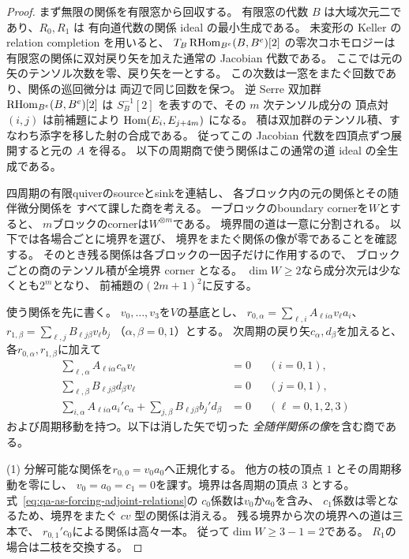 \begin{proof}
まず無限の関係を有限窓から回収する。
有限窓の代数 $B$ は大域次元二であり、$R_0,R_1$ は
有向道代数の関係 ideal の最小生成である。
未変形の Keller の relation completion
\cite[Theorem 6.10]{KellerDeformedCY2011} を用いると、
$T_B\operatorname{RHom}_{B^e}(B,B^e)[2]$ の零次コホモロジーは
有限窓の関係に双対戻り矢を加えた通常の Jacobian 代数である。
ここでは元の矢のテンソル次数を零、戻り矢を一とする。
この次数は一窓をまたぐ回数であり、関係の巡回微分は
両辺で同じ回数を保つ。
逆 Serre 双加群 $\operatorname{RHom}_{B^e}(B,B^e)[2]$ は
$S_B^{-1}[2]$ を表すので、その $m$ 次テンソル成分の
頂点対 $(i,j)$ は前補題により $\operatorname{Hom}(E_i,E_{j+4m})$ になる。
積は双加群のテンソル積、すなわち添字を移した射の合成である。
従ってこの Jacobian 代数を四頂点ずつ展開すると元の $A$ を得る。
以下の周期商で使う関係はこの通常の道 ideal の全生成である。

四周期の有限quiverのsourceとsinkを連結し、
各ブロック内の元の関係とその随伴微分関係を
すべて課した商を考える。
一ブロックのboundary cornerを$W$とすると、
$m$ブロックのcornerは$W^{\otimes m}$である。
境界間の道は一意に分割される。
以下では各場合ごとに境界を選び、
境界をまたぐ関係の像が零であることを確認する。
そのとき残る関係は各ブロックの一因子だけに作用するので、
ブロックごとの商のテンソル積が全境界 corner となる。
$\dim W\ge2$なら成分次元は少なくとも$2^m$となり、
前補題の$(2m+1)^2$に反する。

使う関係を先に書く。
$v_0,\dots,v_3$を$V$の基底とし、
$r_{0,\alpha}=\sum_{\ell,i}A_{\ell i\alpha}v_\ell a_i$、
$r_{1,\beta}=\sum_{\ell,j}B_{\ell j\beta}v_\ell b_j$
（$\alpha,\beta=0,1$）とする。
次周期の戻り矢$c_\alpha,d_\beta$を加えると、
各$r_{0,\alpha},r_{1,\beta}$に加えて
\[
\begin{aligned}
 \sum_{\ell,\alpha}A_{\ell i\alpha}c_\alpha v_\ell&=0
 &&(i=0,1),\\
 \sum_{\ell,\beta}B_{\ell j\beta}d_\beta v_\ell&=0
 &&(j=0,1),\\
 \sum_{i,\alpha}A_{\ell i\alpha}a_i'c_\alpha+
 \sum_{j,\beta}B_{\ell j\beta}b_j'd_\beta&=0
 &&(\ell=0,1,2,3)
\end{aligned}
\tag{Adj-rel}\label{eq:qa-as-forcing-adjoint-relations}
\]
および周期移動を持つ。以下は消した矢で切った
\emph{全随伴関係の像}を含む商である。

(1) 分解可能な関係を$r_{0,0}=v_0a_0$へ正規化する。
他方の枝の頂点 $1$ とその周期移動を零にし、
$v_0=a_0=c_1=0$を課す。境界は各周期の頂点 $3$ とする。
式~\eqref{eq:qa-as-forcing-adjoint-relations}の
$c_0$係数は$v_0$か$a_0$を含み、
$c_1$係数は零となるため、境界をまたぐ $c v$ 型の関係は消える。
残る境界から次の境界への道は三本で、
$r_{0,1}'c_0$による関係は高々一本。
従って$\dim W\ge3-1=2$である。
$R_1$の場合は二枝を交換する。


\end{proof}
